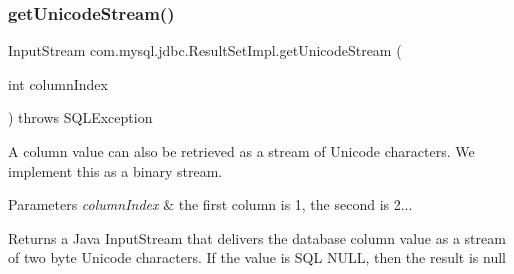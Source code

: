 \subsubsection{\texorpdfstring{get\+Unicode\+Stream()}{getUnicodeStream()}\hspace{0.1cm}{\footnotesize\ttfamily [1/2]}}
{\footnotesize\ttfamily Input\+Stream com.\+mysql.\+jdbc.\+Result\+Set\+Impl.\+get\+Unicode\+Stream (\begin{DoxyParamCaption}\item[{int}]{column\+Index }\end{DoxyParamCaption}) throws S\+Q\+L\+Exception}

A column value can also be retrieved as a stream of Unicode characters. We implement this as a binary stream.


\begin{DoxyParams}{Parameters}
{\em column\+Index} & the first column is 1, the second is 2...\\
\hline
\end{DoxyParams}
\begin{DoxyReturn}{Returns}
a Java Input\+Stream that delivers the database column value as a stream of two byte Unicode characters. If the value is S\+QL N\+U\+LL, then the result is null
\end{DoxyReturn}

